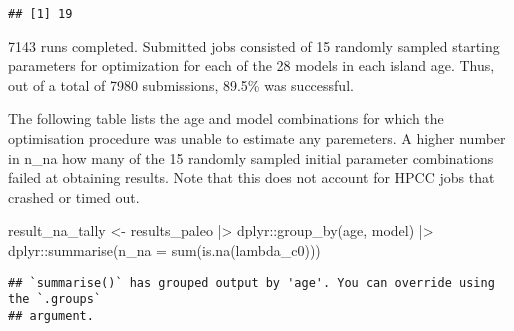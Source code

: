 \documentclass[
]{article}
\newenvironment{Shaded}{\begin{snugshade}}{\end{snugshade}}
\newcommand{\AttributeTok}[1]{\textcolor[rgb]{0.77,0.63,0.00}{#1}}
\newcommand{\FunctionTok}[1]{\textcolor[rgb]{0.00,0.00,0.00}{#1}}
\newcommand{\NormalTok}[1]{#1}
\newcommand{\OtherTok}[1]{\textcolor[rgb]{0.56,0.35,0.01}{#1}}
\newcommand{\SpecialCharTok}[1]{\textcolor[rgb]{0.00,0.00,0.00}{#1}}
\begin{document}
\begin{verbatim}
## [1] 19
\end{verbatim}

7143 runs completed. Submitted jobs consisted of 15 randomly sampled
starting parameters for optimization for each of the 28 models in each
island age. Thus, out of a total of 7980 submissions, 89.5\% was
successful.

The following table lists the age and model combinations for which the
optimisation procedure was unable to estimate any paremeters. A higher
number in n\_na how many of the 15 randomly sampled initial parameter
combinations failed at obtaining results. Note that this does not
account for HPCC jobs that crashed or timed out.

\begin{Shaded}
\begin{Highlighting}[]
\NormalTok{result\_na\_tally }\OtherTok{\textless{}{-}}\NormalTok{ results\_paleo }\SpecialCharTok{|\textgreater{}} 
\NormalTok{  dplyr}\SpecialCharTok{::}\FunctionTok{group\_by}\NormalTok{(age, model) }\SpecialCharTok{|\textgreater{}} 
\NormalTok{  dplyr}\SpecialCharTok{::}\FunctionTok{summarise}\NormalTok{(}\AttributeTok{n\_na =} \FunctionTok{sum}\NormalTok{(}\FunctionTok{is.na}\NormalTok{(lambda\_c0)))}
\end{Highlighting}
\end{Shaded}

\begin{verbatim}
## `summarise()` has grouped output by 'age'. You can override using the `.groups`
## argument.
\end{verbatim}

\begin{Shaded}
\end{Shaded}
\end{document}
